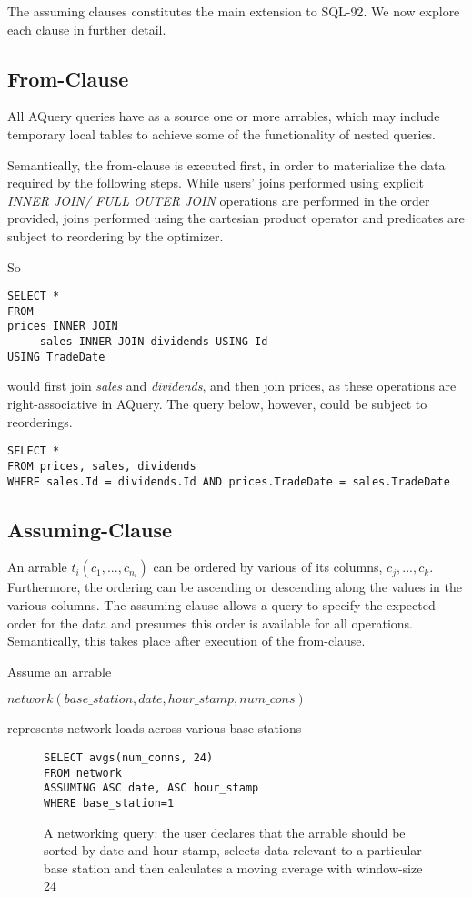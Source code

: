 \documentclass{acm_proc_article-sp}
\begin{document}
The assuming clauses constitutes the main extension to SQL-92. We now explore each clause in further detail.

\subsection{From-Clause}
All AQuery queries have as a source one or more arrables, which may include temporary local tables to achieve some of the functionality of nested queries.

Semantically, the from-clause is executed first, in order to materialize the data required by the following steps. While users' joins performed using explicit \textit{INNER JOIN/ FULL OUTER JOIN} operations are performed in the order provided, joins performed using the cartesian product operator and predicates are subject to reordering by the optimizer.

So 

\begin{lstlisting}
SELECT * 
FROM 
prices INNER JOIN 
     sales INNER JOIN dividends USING Id
USING TradeDate
\end{lstlisting}

would first join \textit{sales} and \textit{dividends}, and then join prices, as these operations are right-associative in AQuery. The query below, however, could be subject to reorderings.

\begin{lstlisting}
SELECT * 
FROM prices, sales, dividends 
WHERE sales.Id = dividends.Id AND prices.TradeDate = sales.TradeDate
\end{lstlisting}


\subsection{Assuming-Clause}
An arrable $t_i(c_1, ..., c_{n_i})$ can be ordered by various of its columns, $c_j,...,c_k$. Furthermore, the ordering can be ascending or descending along the values in the various columns. The assuming clause allows a query to specify the expected order for the data and presumes this order is available for all operations. Semantically, this takes place after execution of the from-clause. 

Assume an arrable 

$network(base\_station, date, hour\_stamp, num\_cons)$ 

represents network loads across various base stations

\begin{figure}
\begin{lstlisting}
SELECT avgs(num_conns, 24)
FROM network
ASSUMING ASC date, ASC hour_stamp
WHERE base_station=1
\end{lstlisting}
\caption{A networking query: the user declares that the arrable should be sorted by date and hour stamp, selects data relevant to a particular base station and then calculates a moving average with window-size 24}
\label{network-mavg}
\end{figure}
\end{document}
